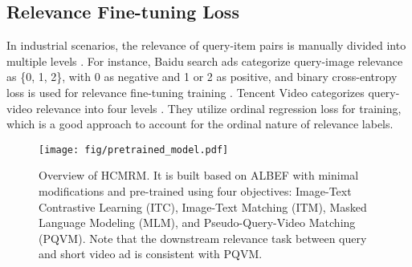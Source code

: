 \subsection{Relevance Fine-tuning Loss}
In industrial scenarios, the relevance of query-item pairs is manually divided into multiple levels \cite{Yao2021LearningAP, Zou2021PretrainedLM, Wen2023EnhancingDI, Ye2023QueryawareMB}. For instance, Baidu search ads categorize query-image relevance as \{0, 1, 2\}, with 0 as negative and 1 or 2 as positive, and binary cross-entropy loss is used for relevance fine-tuning training \cite{Wen2023EnhancingDI}. Tencent Video categorizes query-video relevance into four levels \cite{Ye2023QueryawareMB}. They utilize ordinal regression loss for training, which is a good approach to account for the ordinal nature of relevance labels.


\begin{figure*}
  \texttt{[image: fig/pretrained\_model.pdf]}
  \caption{Overview of HCMRM. It is built based on ALBEF with minimal modifications and pre-trained using four objectives: Image-Text Contrastive Learning (ITC), Image-Text Matching (ITM), Masked Language Modeling (MLM), and Pseudo-Query-Video Matching (PQVM). Note that the downstream relevance task between query and short video ad is consistent with PQVM.}
  \label{fig:pretrained_model}
\end{figure*}